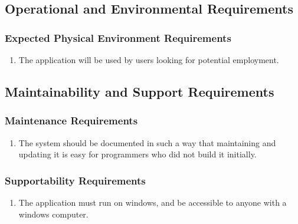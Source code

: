 \documentclass[english]{article}
\begin{document}

\subsection{Operational and Environmental Requirements}
\label{sub:operational_and_environmental_requirements}

\subsubsection{Expected Physical Environment Requirements}
\label{ssub:expected_physical_environment}
\begin{enumerate}[{EPER}1. ]
\item The application will be used by users looking for potential employment.

\end{enumerate}



\subsection{Maintainability and Support Requirements}
\label{sub:maintainability_and_support_requirements}

\subsubsection{Maintenance Requirements}
\label{ssub:maintenance_requirements}
\begin{enumerate}[{MR}1. ]
\item The system should be documented in such a way that maintaining and updating it is easy for programmers who did not build it initially.

\end{enumerate}

\subsubsection{Supportability Requirements}
\label{ssub:supportability_requirements}
\begin{enumerate}[{MSR}1. ]
\item The application must run on windows, and be accessible to anyone with a windows computer.

\end{enumerate}
\end{document}
